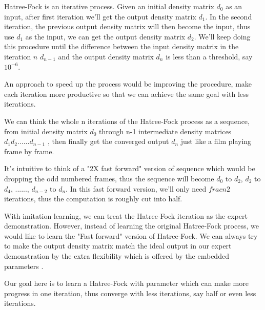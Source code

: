 \documentclass[twoside]{article}
\begin{document}




Hatree-Fock is an iterative process. Given an initial density matrix $d_0$ as an input, after first iteration we'll get the output density matrix $d_1$. In the second iteration, the previous output density matrix will then become the input, thus use $d_1$ as the input, we can get the output density matrix $d_2$. We'll keep doing this procedure until the difference between the input density matrix in the iteration $n$ $d_{n-1}$  and the output density matrix $d_n$ is less than a threshold, say $10^{-6}$. 

An approach to speed up the process would be improving the procedure, make each iteration more productive so that we can achieve the same goal with less iterations. 

We can think the whole n iterations of the Hatree-Fock process as a sequence, from initial density matrix $d_0$ through n-1 intermediate density matrices $d_1 d_2 ...... d_{n-1}$ , then finally get the converged output $d_{n}$ just like a film playing frame by frame. 

It's intuitive to think of a "2X fast forward" version of sequence which would be dropping the odd numbered frames, thus the sequence will become $d_0$ to $d_2$, $d_2$ to $d_4$, ......, $d_{n-2}$ to $d_n$. In this fast forward version, we'll only need $frac{n}{2}$ iterations, thus the computation is roughly cut into half.

With imitation learning,
we can treat the Hatree-Fock iteration as the expert demonstration. However, instead of learning the original Hatree-Fock process, we would like to learn the "Fast forward" version of Hatree-Fock. We can always try to make the output density matrix match the ideal output in our expert demonstration by the extra flexibility which is offered by the embedded parameters .


Our goal here is to learn a Hatree-Fock with parameter which can make more progress in one iteration, thus converge with less iterations, say half or even less iterations.  
\end{document}

